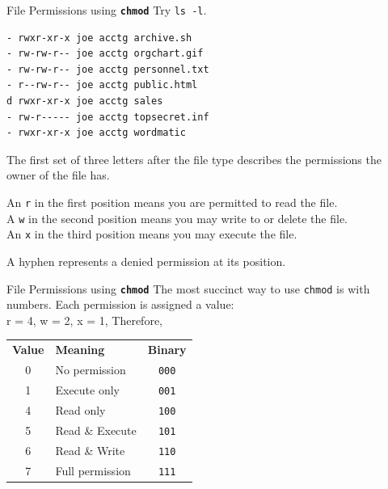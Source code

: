 \documentclass[14pt,aspectratio=1610]{beamer}
\begin{document}
\begin{frame}[fragile]{File Permissions using \texttt{\textbf{chmod}}}
Try \lstinline{ls -l}.\\\vspace{0.5em}
{\footnotesize
\begin{lstlisting}[language={}]
- rwxr-xr-x joe acctg archive.sh
- rw-rw-r-- joe acctg orgchart.gif
- rw-rw-r-- joe acctg personnel.txt
- r--rw-r-- joe acctg public.html
d rwxr-xr-x joe acctg sales
- rw-r----- joe acctg topsecret.inf
- rwxr-xr-x joe acctg wordmatic
\end{lstlisting}}


\small
The first set of three letters after the file type describes the permissions the owner of the file has.\\\vspace{0.5em}

An \lstinline{r} in the first position means you are permitted to read the file.\\
A \lstinline{w} in the second position means you may write to or delete the file.\\
An \lstinline{x} in the third position means you may execute the file.\\\vspace{0.5em}

A hyphen represents a denied permission at its position.
\end{frame}

\begin{frame}{File Permissions using \texttt{\textbf{chmod}}}
The most succinct way to use \lstinline{chmod} is with numbers.  Each permission is assigned a value:\\
r = 4, w = 2, x = 1, Therefore,\\[0.5em]

\begin{tabular}{c l c}
\textbf{Value} & \textbf{Meaning} & \textbf{Binary}\\
0 & No permission    & \texttt{000} \\
1 & Execute only     & \texttt{001} \\
4 & Read only        & \texttt{100} \\
5 & Read \& Execute  & \texttt{101} \\
6 & Read \& Write    & \texttt{110} \\
7 & Full permission  & \texttt{111} \\
\end{tabular}
\end{frame}
\end{document}
